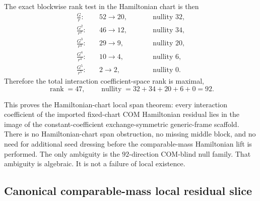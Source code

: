 \documentclass[11pt]{article}
\begin{document}
The exact blockwise rank test in the Hamiltonian chart is then
\begin{equation}
\begin{aligned}
\frac{G}{r}:&\quad 52\to 20, &\qquad& \text{nullity }32,\\
\frac{G^2}{r^2}:&\quad 46\to 12, && \text{nullity }34,\\
\frac{G^3}{r^3}:&\quad 29\to 9, && \text{nullity }20,\\
\frac{G^4}{r^4}:&\quad 10\to 4, && \text{nullity }6,\\
\frac{G^5}{r^5}:&\quad 2\to 2, && \text{nullity }0.
\end{aligned}
\label{eq:4pn-local-hamiltonian-ranks}
\end{equation}
Therefore the total interaction coefficient-space rank is maximal,
\begin{equation}
\operatorname{rank}=47,
\qquad
\operatorname{nullity}=32+34+20+6+0=92.
\label{eq:4pn-local-hamiltonian-total-rank-nullity}
\end{equation}

This proves the Hamiltonian-chart local span theorem: every interaction
coefficient of the imported fixed-chart COM Hamiltonian residual lies in the
image of the constant-coefficient exchange-symmetric generic-frame scaffold.
There is no Hamiltonian-chart span obstruction, no missing middle block, and no
need for additional seed dressing before the comparable-mass Hamiltonian lift is
performed.  The only ambiguity is the $92$-direction COM-blind null family.
That ambiguity is algebraic.  It is not a failure of local existence.

\subsection{Canonical comparable-mass local residual slice}
\label{sec:local-canonical-slice}
\end{document}
